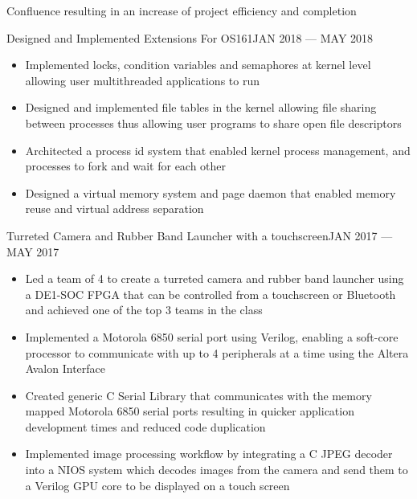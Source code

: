 \begin{projects}
{\begin{itemize}
                  Confluence resulting in an increase of project efficiency and completion
        \end{itemize}
    }
    \project
    {Designed and Implemented Extensions For OS161}{JAN 2018 --- MAY 2018}{}{
        \begin{itemize}
        \item Implemented locks, condition variables and semaphores at kernel level allowing user
              multithreaded applications to run
        \item Designed and implemented file tables in the kernel allowing file sharing between
              processes thus allowing user programs to share open file descriptors
        \item Architected a process id system that enabled kernel process management, and
              processes to fork and wait for each other
        \item Designed a virtual memory system and page daemon that enabled memory reuse and virtual
              address separation
        \end{itemize}
    }
    \project
    {Turreted Camera and Rubber Band Launcher with a touchscreen}{JAN 2017 --- MAY 2017}{}{
        \begin{itemize}
            \item Led a team of 4 to create a turreted camera and rubber band launcher using a
                  DE1-SOC FPGA that can be controlled from a touchscreen or Bluetooth and achieved
                  one of the top 3 teams in the class
            \item Implemented a Motorola 6850 serial port using Verilog, enabling a soft-core
                  processor to communicate with up to 4 peripherals at a time using the Altera
                  Avalon Interface
            \item Created generic C Serial Library that communicates with the memory mapped
                  Motorola 6850 serial ports resulting in quicker application development times and
                  reduced code duplication
            \item Implemented image processing workflow by integrating a C JPEG decoder into a
                  NIOS system which decodes images from the camera and send them to a Verilog GPU core
                  to be displayed on a touch screen
        \end{itemize}
    }
\end{projects}
